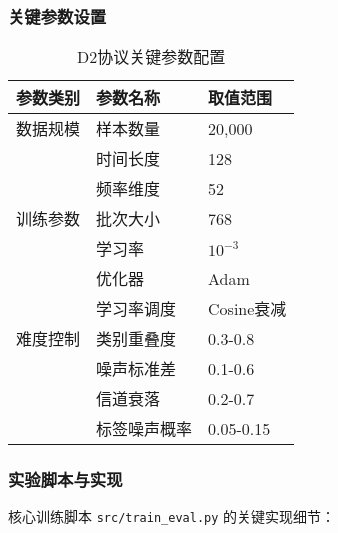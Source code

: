 \subsubsection{关键参数设置}
\begin{table}[h]
\centering
\caption{D2协议关键参数配置}
\label{tab:d2_parameters}
\begin{tabular}{@{}lll@{}}
\toprule
参数类别 & 参数名称 & 取值范围 \\
\midrule
数据规模 & 样本数量 & 20,000 \\
& 时间长度 & 128 \\
& 频率维度 & 52 \\
\midrule
训练参数 & 批次大小 & 768 \\
& 学习率 & $10^{-3}$ \\
& 优化器 & Adam \\
& 学习率调度 & Cosine衰减 \\
\midrule
难度控制 & 类别重叠度 & 0.3-0.8 \\
& 噪声标准差 & 0.1-0.6 \\
& 信道衰落 & 0.2-0.7 \\
& 标签噪声概率 & 0.05-0.15 \\
\bottomrule
\end{tabular}
\end{table}

\subsubsection{实验脚本与实现}
核心训练脚本 \texttt{src/train\_eval.py} 的关键实现细节：

